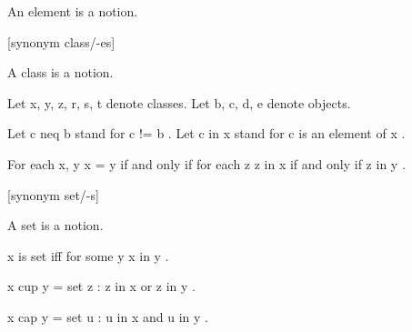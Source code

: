 \documentclass[a4paper,draft]{amsproc}
\begin{document}
\begin{forthel}
\begin{signature}[ElmSort]
An element is a notion.
\end{signature}


[synonym class/-es]
\begin{signature}
A class is a notion.
\end{signature}


Let  x, y, z, r, s, t  denote classes.
Let  b, c, d, e  denote objects.

Let  c neq b  stand for  c  !=  b .
Let  c in x  stand for  c  is an element of  x .

\begin{axiom}
For each  x, y   x = y  if and only if for each  z   z in x  if and only if  z in y .
\end{axiom}


[synonym set/-s]
\begin{signature}
A set is a notion.
\end{signature}

\begin{definition} 
 x  is set iff for some  y   x in y .
\end{definition}


\begin{definition} 
 x cup y = { set  z : z in x  or  z in y } .
\end{definition}

\begin{definition} 
 x cap y = { set  u : u in x  and  u in y } .
\end{definition}


\end{forthel}
\end{document}
